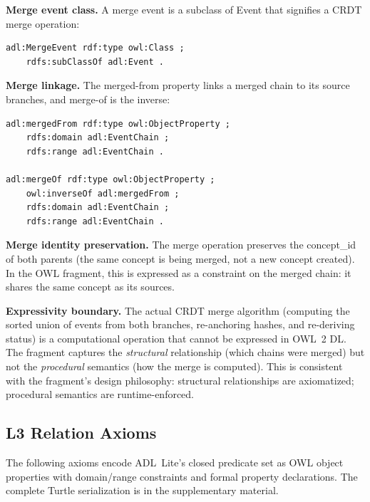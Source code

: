 \textbf{Merge event class.}
A merge event is a subclass of Event that signifies a CRDT merge operation:
\begin{verbatim}
adl:MergeEvent rdf:type owl:Class ;
    rdfs:subClassOf adl:Event .
\end{verbatim}

\textbf{Merge linkage.}
The merged-from property links a merged chain to its source branches, and merge-of is the inverse:
\begin{verbatim}
adl:mergedFrom rdf:type owl:ObjectProperty ;
    rdfs:domain adl:EventChain ;
    rdfs:range adl:EventChain .

adl:mergeOf rdf:type owl:ObjectProperty ;
    owl:inverseOf adl:mergedFrom ;
    rdfs:domain adl:EventChain ;
    rdfs:range adl:EventChain .
\end{verbatim}

\textbf{Merge identity preservation.}
The merge operation preserves the concept\_id of both parents (the same concept is being merged, not a new concept created). In the OWL fragment, this is expressed as a constraint on the merged chain: it shares the same concept as its sources.

\textbf{Expressivity boundary.}
The actual CRDT merge algorithm (computing the sorted union of events from both branches, re-anchoring hashes, and re-deriving status) is a computational operation that cannot be expressed in OWL~2 DL. The fragment captures the \emph{structural} relationship (which chains were merged) but not the \emph{procedural} semantics (how the merge is computed). This is consistent with the fragment's design philosophy: structural relationships are axiomatized; procedural semantics are runtime-enforced.

\subsection{L3 Relation Axioms}

The following axioms encode ADL~Lite's closed predicate set as OWL object properties with domain/range constraints and formal property declarations. The complete Turtle serialization is in the supplementary material.

